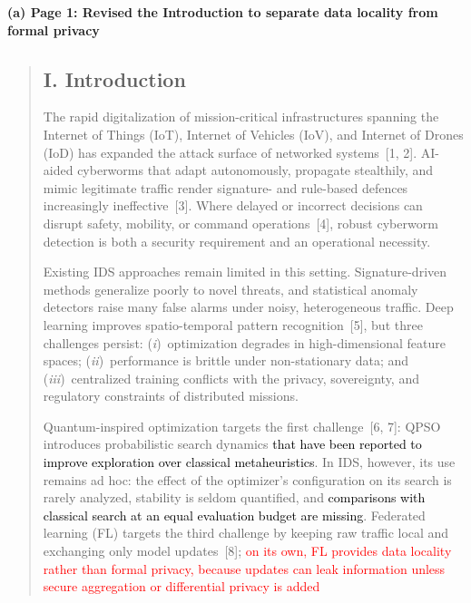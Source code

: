 \documentclass[11pt]{article}
\newenvironment{excerpt}{\begin{quote}\sloppy}{\end{quote}}
\newcommand{\mshead}[2]{\subsection*{\textbf{#1. #2}}}
\newcommand{\loc}[1]{\par\medskip\noindent\textbf{#1}\par}
\begin{document}
\loc{(a) Page 1: Revised the Introduction to separate data locality from formal privacy}
\begin{excerpt}
\mshead{I}{Introduction}

The rapid digitalization of mission-critical infrastructures spanning
the Internet of Things (IoT), Internet of Vehicles (IoV), and Internet
of Drones (IoD) has expanded the attack surface of networked
systems~{[1, 2]}. AI-aided cyberworms that
adapt autonomously, propagate stealthily, and mimic legitimate
traffic render signature- and rule-based defences increasingly
ineffective~{[3]}. Where delayed or incorrect decisions can
disrupt safety, mobility, or command operations~{[4]},
robust cyberworm detection is both a security requirement and an
operational necessity.

Existing IDS approaches remain limited in this setting.
Signature-driven methods generalize poorly to novel threats, and
statistical anomaly detectors raise many false alarms under noisy,
heterogeneous traffic. Deep learning improves spatio-temporal pattern
recognition~{[5]}, but three challenges persist:
(\textit{i})~optimization degrades in high-dimensional feature spaces;
(\textit{ii})~performance is brittle under non-stationary data; and
(\textit{iii})~centralized training conflicts with the privacy,
sovereignty, and regulatory constraints of distributed missions.

Quantum-inspired optimization targets the first
challenge~{[6, 7]}: QPSO introduces
probabilistic search dynamics \textcolor{black}{that have been reported
to improve exploration over classical metaheuristics}. In IDS,
however, its use remains ad hoc: the effect of the optimizer's
configuration on its search is rarely analyzed, stability is seldom quantified, and
\textcolor{black}{comparisons with classical search at an equal
evaluation budget are missing}. Federated learning (FL) targets the
third challenge by keeping raw traffic local and exchanging only
model updates~{[8]}; \textcolor{red}{on its
own, FL provides data locality rather than formal privacy, because
updates can leak information unless secure aggregation or
differential privacy is added}
\end{excerpt}
\end{document}
